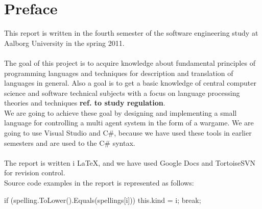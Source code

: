 \chapter*{Preface}
This report is written in the fourth semester of the software engineering study at Aalborg University in the spring 2011.
\\
\\
The goal of this project is to acquire knowledge about fundamental principles of programming languages and techniques for description and translation of languages in general. Also a goal is to get a basic knowledge of central computer science and software technical subjects with a focus on language processing theories and techniques \textbf{ref. to study regulation}.\\
  We are going to achieve these goal by designing and implementing a small language for controlling a multi agent system in the form of a wargame. We are going to use Visual Studio and C\#, because we have used these tools in earlier semesters and are used to the C\# syntax.
	\\
	\\
	The report is written i \LaTeX, and we have used Google Docs and TortoiseSVN for revision control.
	\\

Source code examples in the report is represented as follows:
\begin{source}[]{}
if (spelling.ToLower().Equals(spellings[i]))
	{
		this.kind = i;
		break;
	}
\end{source}
